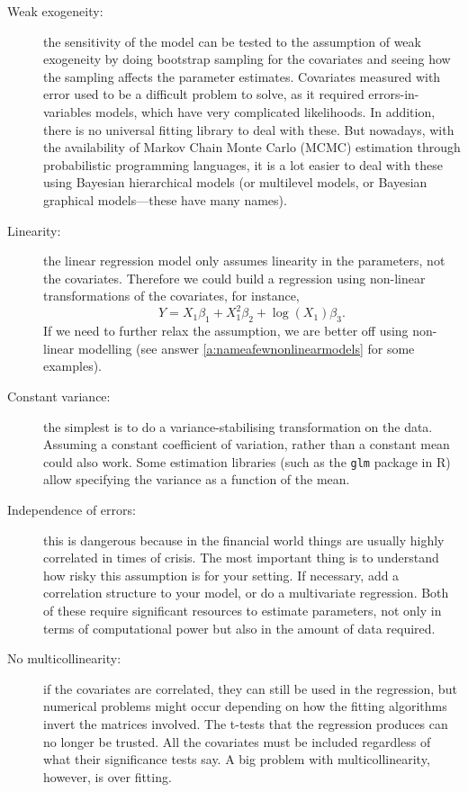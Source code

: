 \documentclass[a4paper]{article}
\begin{document}
\begin{description}
  \item[Weak exogeneity:] the sensitivity of the model can be tested to the assumption of weak exogeneity by doing bootstrap sampling for the covariates and seeing how the sampling affects the parameter estimates.
  Covariates measured with error used to be a difficult problem to solve, as it required errors-in-variables models, which have very complicated likelihoods. In addition, there is no universal fitting library to deal with these. But nowadays, with the availability of Markov Chain Monte Carlo (MCMC) estimation through probabilistic programming languages, it is a lot easier to deal with these using Bayesian hierarchical models (or multilevel models, or Bayesian graphical models---these have many names).
  \item[Linearity:] the linear regression model only assumes linearity in the parameters, not the covariates. Therefore  we could build a regression using non-linear transformations of the covariates, for instance,
  \[
    Y = X_1 \beta_1 +
        X_1^2 \beta_2 +
        \log(X_1) \beta_3
    \text{.}
  \]
  If we need to further relax the assumption, we are better off using non-linear modelling (see answer \ref{a:nameafewnonlinearmodels} for some examples).
  \item[Constant variance:] the simplest is to do a variance-stabilising transformation on the data. Assuming a constant coefficient of variation, rather than a constant mean could also work. Some estimation libraries (such as the \verb+glm+ package in R) allow specifying the variance as a function of the mean.
  \item[Independence of errors:] this is dangerous because in the financial world things are usually highly correlated in times of crisis. The most important thing is to understand how risky this assumption is for your setting. If necessary, add a correlation structure to your model, or do  a multivariate regression. Both of these require significant resources to estimate parameters, not only in terms of computational power but also in the amount of data required.
  \item[No multicollinearity:] if the covariates are correlated, they can still be used in the regression, but numerical problems might occur depending on how the fitting algorithms invert the matrices involved.
  The t-tests that the regression produces can no longer be trusted. All the covariates must be included regardless of what their significance tests say.
  A big problem with multicollinearity, however, is over fitting.

\end{description}
\end{document}
